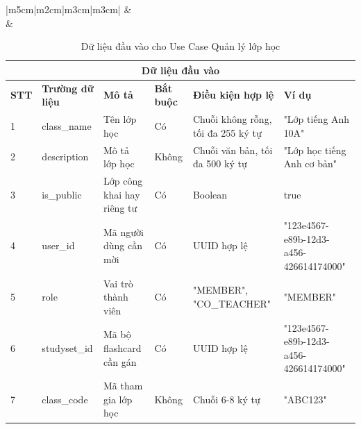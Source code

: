 \documentclass[../DoAn.tex]{subfiles}
\begin{document}
\begin{table}[h!]
\begin{tabular}{|m{5cm}|m{2cm}|m{3cm}|m{3cm}|}
     & 
     \\
    \hline
     &  \\
    \hline
\end{tabular}
\caption{Thông tin chi tiết về Use Case Quản lý lớp học}
\end{table}

\vspace{0.5cm}

\begin{table}[h!]
\centering
\begin{tabular}{|m{1cm}|m{2.5cm}|m{3cm}|m{1cm}|m{2.5cm}|m{3.5cm}|}
    \hline
    \multicolumn{6}{|c|}{\textbf{Dữ liệu đầu vào}} \\
    \hline
    \textbf{STT} & \textbf{Trường dữ liệu} & \textbf{Mô tả} & \textbf{Bắt buộc} & \textbf{Điều kiện hợp lệ} & \textbf{Ví dụ} \\
    \hline
    1 & class\_name & Tên lớp học & Có & Chuỗi không rỗng, tối đa 255 ký tự & "Lớp tiếng Anh 10A" \\
    \hline
    2 & description & Mô tả lớp học & Không & Chuỗi văn bản, tối đa 500 ký tự & "Lớp học tiếng Anh cơ bản" \\
    \hline
    3 & is\_public & Lớp công khai hay riêng tư & Có & Boolean & true \\
    \hline
    4 & user\_id & Mã người dùng cần mời & Có & UUID hợp lệ & "123e4567-e89b-12d3-a456-426614174000" \\
    \hline
    5 & role & Vai trò thành viên & Có & "MEMBER", "CO\_TEACHER" & "MEMBER" \\
    \hline
    6 & studyset\_id & Mã bộ flashcard cần gán & Có & UUID hợp lệ & "123e4567-e89b-12d3-a456-426614174000" \\
    \hline
    7 & class\_code & Mã tham gia lớp học & Không & Chuỗi 6-8 ký tự & "ABC123" \\
    \hline
\end{tabular}
\caption{Dữ liệu đầu vào cho Use Case Quản lý lớp học}
\end{table}
\end{document}
